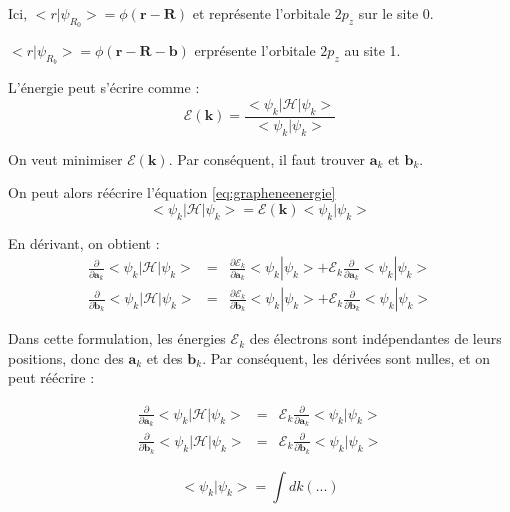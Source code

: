 Ici, $<r|\psi_{R_0}> = \phi(\mathbf{r}-\mathbf{R})$ et représente l'orbitale
$2p_z$ sur le site 0.

$<r|\psi_{R_b}> = \phi(\mathbf{r}-\mathbf{R}-\mathbf{b})$ erprésente l'orbitale
$2p_z$ au site 1.

L'énergie peut s'écrire comme :
\begin{equation}
    \mathcal{E}(\mathbf{k}) = \frac{<\psi_k|\mathcal{H}|\psi_k>}{<\psi_k|\psi_k>}
\label{eq:grapheneenergie}
\end{equation}

On veut minimiser $\mathcal{E}(\mathbf{k})$. Par conséquent, il faut trouver
$\mathbf{a}_k$ et $\mathbf{b}_k$.

On peut alors réécrire l'équation \ref{eq:grapheneenergie}
\begin{equation}
    <\psi_k|\mathcal{H}|\psi_k> = \mathcal{E}(\mathbf{k}) <\psi_k|\psi_k>
\end{equation}

En dérivant, on obtient :
\begin{eqnarray}
    \frac{\partial}{\partial \mathbf{a}_k} <\psi_k|\mathcal{H}|\psi_k> & = &
    \frac{\partial \mathcal{E}_k}{\partial \mathbf{a}_k} <\psi_k|\psi_k> +
    \mathcal{E}_k \frac{\partial}{\partial\mathbf{a}_k} <\psi_k | \psi_k>\\
    \frac{\partial}{\partial \mathbf{b}_k} <\psi_k|\mathcal{H}|\psi_k> & = &
    \frac{\partial \mathcal{E}_k}{\partial \mathbf{b}_k} <\psi_k|\psi_k> +
    \mathcal{E}_k \frac{\partial}{\partial\mathbf{b}_k} <\psi_k | \psi_k>
\end{eqnarray}

Dans cette formulation, les énergies $\mathcal{E}_k$ des électrons sont
indépendantes de leurs positions, donc des $\mathbf{a}_k$ et des $\mathbf{b}_k$.
Par conséquent, les dérivées sont nulles, et on peut réécrire :

\begin{eqnarray}
    \frac{\partial}{\partial \mathbf{a}_k} <\psi_k|\mathcal{H}|\psi_k> & = &
    \mathcal{E}_k \frac{\partial}{\partial\mathbf{a}_k} <\psi_k | \psi_k>\\
    \frac{\partial}{\partial \mathbf{b}_k} <\psi_k|\mathcal{H}|\psi_k> & = &
    \mathcal{E}_k \frac{\partial}{\partial\mathbf{b}_k} <\psi_k | \psi_k>
\end{eqnarray}

\begin{equation}
    <\psi_k|\psi_k> = \int dk (...)
\end{equation}


